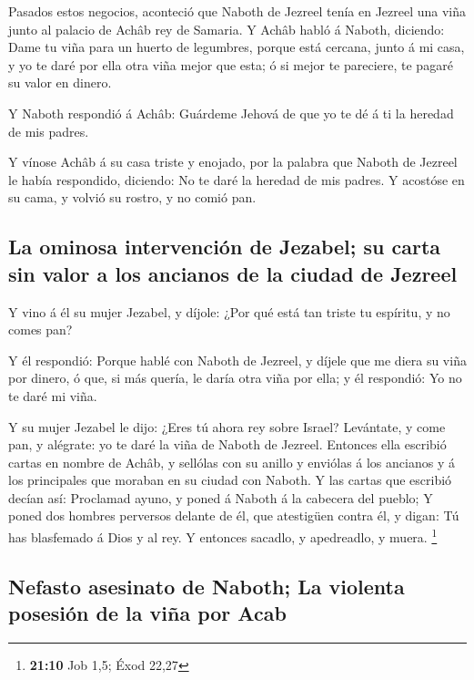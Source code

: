  Pasados estos negocios, aconteció que Naboth de Jezreel
tenía en Jezreel una viña junto al palacio de Achâb rey de Samaria.
 Y Achâb habló á Naboth, diciendo: Dame tu viña para un
huerto de legumbres, porque está cercana, junto á mi casa, y yo te daré
por ella otra viña mejor que esta; ó si mejor te pareciere, te pagaré su
valor en dinero.

 Y Naboth respondió á Achâb: Guárdeme Jehová de que yo te
dé á ti la heredad de mis padres.

 Y vínose Achâb á su casa triste y enojado, por la palabra
que Naboth de Jezreel le había respondido, diciendo: No te daré la
heredad de mis padres. Y acostóse en su cama, y volvió su rostro, y no
comió pan.

\hypertarget{la-ominosa-intervenciuxf3n-de-jezabel-su-carta-sin-valor-a-los-ancianos-de-la-ciudad-de-jezreel}{%
\subsection{La ominosa intervención de Jezabel; su carta sin valor a los
ancianos de la ciudad de
Jezreel}\label{la-ominosa-intervenciuxf3n-de-jezabel-su-carta-sin-valor-a-los-ancianos-de-la-ciudad-de-jezreel}}

 Y vino á él su mujer Jezabel, y díjole: ¿Por qué está tan
triste tu espíritu, y no comes pan?

 Y él respondió: Porque hablé con Naboth de Jezreel, y
díjele que me diera su viña por dinero, ó que, si más quería, le daría
otra viña por ella; y él respondió: Yo no te daré mi viña.

 Y su mujer Jezabel le dijo: ¿Eres tú ahora rey sobre
Israel? Levántate, y come pan, y alégrate: yo te daré la viña de Naboth
de Jezreel.  Entonces ella escribió cartas en nombre de
Achâb, y sellólas con su anillo y enviólas á los ancianos y á los
principales que moraban en su ciudad con Naboth.  Y las
cartas que escribió decían así: Proclamad ayuno, y poned á Naboth á la
cabecera del pueblo;  Y poned dos hombres perversos
delante de él, que atestigüen contra él, y digan: Tú has blasfemado á
Dios y al rey. Y entonces sacadlo, y apedreadlo, y muera. \footnote{\textbf{21:10}
  Job 1,5; Éxod 22,27}

\hypertarget{nefasto-asesinato-de-naboth-la-violenta-posesiuxf3n-de-la-viuxf1a-por-acab}{%
\subsection{Nefasto asesinato de Naboth; La violenta posesión de la viña
por
Acab}\label{nefasto-asesinato-de-naboth-la-violenta-posesiuxf3n-de-la-viuxf1a-por-acab}}

